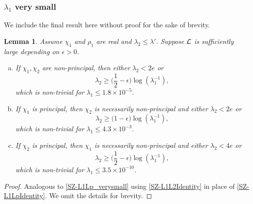 \documentclass[12pt,psamsfonts]{amsart}
\newtheorem{lem}[thm]{Lemma}
\theoremstyle{definition}
\theoremstyle{remark}
\numberwithin{equation}{section}
\begin{document}
\subsubsection{$\lambda_1$ very small}

We include the final result here without proof for the sake of brevity. 

\begin{lem} \label{SZ-L1L2_verysmall} Assume $\chi_1$ and $\rho_1$ are real and $\lambda_2 \leq \lambda'$.  Suppose $\mathcal{L}$ is sufficiently large depending on $\epsilon > 0$.

\begin{enumerate}[(a)]
	\item If $\chi_1,\chi_2$ are non-principal, then either $\lambda_2 < 2e$ or 
	\[
	\lambda_2 \geq \Big(\frac{1}{2} - \epsilon\Big) \log(\lambda_1^{-1}), 
	\]
	which is non-trivial for $\lambda_1 \leq 1.8 \times 10^{-5}$. 
	\item If $\chi_1$ is principal, then $\chi_2$ is necessarily non-principal and either $\lambda_2 < 2e$ or
	\[
	\lambda_2 \geq \big(1 - \epsilon\big) \log(\lambda_1^{-1}),
	\]
	which is non-trivial for $\lambda_1 \leq 4.3 \times 10^{-3}$. 
	\item If $\chi_2$ is principal, then $\chi_1$ is necessarily non-principal and either $\lambda_2 < 4e$ or
	\[
	\lambda_2 \geq \Big(\frac{1}{2} - \epsilon\Big) \log(\lambda_1^{-1}),
	\]
	which is non-trivial for $\lambda_1 \leq 3.5 \times 10^{-10}$. 
\end{enumerate}
\end{lem}
\begin{proof} Analogous to \cref{SZ-L1Lp_verysmall} using \cref{SZ-L1L2Identity} in place of \cref{SZ-L1LpIdentity}. We omit the details for brevity.
\end{proof}
\end{document}
